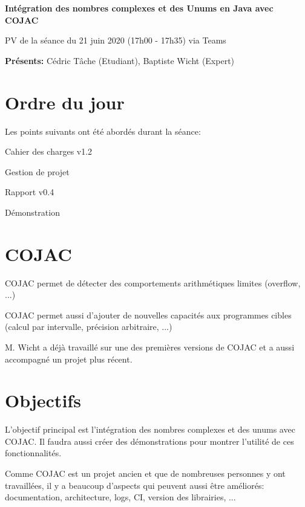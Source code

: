 \documentclass[11pt]{meetingmins}
\date{21 juin 2021}
\begin{document}
\begin {center} {
    \large \textbf {Intégration des nombres complexes et des Unums en Java avec COJAC}
}
\vspace {0.5ex}

PV de la séance du 21 juin 2020 (17h00 - 17h35) via Teams
\end {center} \vspace {1.5em}

\noindent
\textbf{Présents:} Cédric Tâche (Etudiant), Baptiste Wicht (Expert)

\section{Ordre du jour}
Les points suivants ont été abordés durant la séance:
\begin{hiddenitems}
    \item Cahier des charges v1.2
    \item Gestion de projet
    \item Rapport v0.4
    \item Démonstration
\end{hiddenitems}

\section{COJAC}
\begin{hiddenitems}
    \item COJAC permet de détecter des comportements arithmétiques limites (overflow, ...)
    \item COJAC permet aussi d'ajouter de nouvelles capacités aux programmes cibles (calcul par intervalle, précision arbitraire, ...)
    \item M. Wicht a déjà travaillé sur une des premières versions de COJAC et a aussi accompagné un projet plus récent.
\end{hiddenitems}

\section{Objectifs}
\begin{hiddenitems}
    \item L'objectif principal est l'intégration des nombres complexes et des unums avec COJAC. Il faudra aussi créer des démonstrations pour montrer l'utilité de ces fonctionnalités.
    \item Comme COJAC est un projet ancien et que de nombreuses personnes y ont travaillées, il y a beaucoup d'aspects qui peuvent aussi être améliorés: documentation, architecture, logs, CI, version des librairies, ...
\end{hiddenitems}
\end{document}
